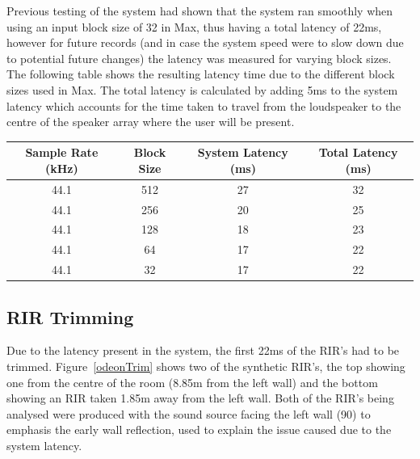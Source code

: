 \documentclass[../../main.tex]{subfiles}
\begin{document}
		Previous testing of the system had shown that the system ran smoothly when using an input block size of 32 in Max, thus having a total latency of 22ms, however for future records (and in case the system speed were to slow down due to potential future changes) the latency was measured for varying block sizes. The following table shows the resulting latency time due to the different block sizes used in Max. The total latency is calculated by adding 5ms to the system latency which accounts for the time taken to travel from the loudspeaker to the centre of the speaker array where the user will be present.

		\vspace{5mm}

		\begin{center}
		\begin{tabular}{|c |c |c |c|}
		\hline
		Sample Rate (kHz) & Block Size & System Latency (ms) & Total Latency (ms) \\ \hline
		44.1 & 512 & 27 & 32 \\ \hline
		44.1 & 256 & 20 & 25 \\ \hline
		44.1 & 128 & 18 & 23 \\ \hline
		44.1 & 64 & 17 & 22 \\ \hline
		44.1 & 32 & 17 & 22 \\ \hline
		\end{tabular}
		\end{center}


	\subsection{RIR Trimming}
	\label{RIRtrimming}
		Due to the latency present in the system, the first 22ms of the \ac{RIR}'s had to be trimmed. Figure~\ref{odeonTrim} shows two of the synthetic \ac{RIR}'s, the top showing one from the centre of the room (8.85m from the left wall) and the bottom showing an \ac{RIR} taken 1.85m away from the left wall. Both of the \ac{RIR}'s being analysed were produced with the sound source facing the left wall (90\textdegree) to emphasis the early wall reflection, used to explain the issue caused due to the system latency. 
\end{document}
